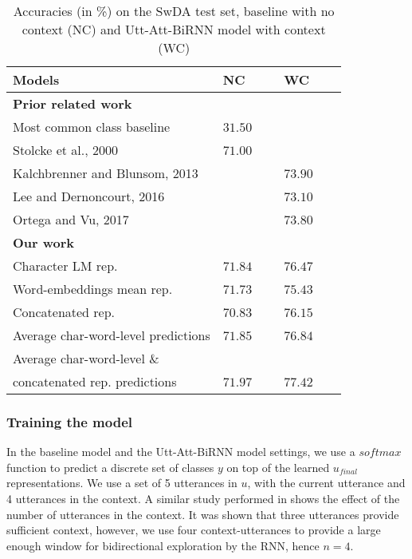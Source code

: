 \documentclass[a4paper]{article}
\begin{document}
\begin{table}[b]
  \caption{Accuracies (in \%) on the SwDA test set, baseline with no context (NC) and Utt-Att-BiRNN model with context (WC)}
  \label{tab:accOnSwDA}
  \centering
  \begin{tabular}{ lll }
    \toprule
    \textbf{Models}       & \textbf{NC}  & \textbf{WC}  \\
\midrule
\textbf{Prior related work}    &    &  \\
    Most common class baseline        & $31.50$~~~    &  \\
    Stolcke et al., 2000 \cite{stolcke2000dialogue} & $71.00$~~~ &    \\
    Kalchbrenner and Blunsom, 2013 \cite{kalchbrenner2013recurrent} & & $73.90$~~~ \\
    Lee and Dernoncourt, 2016 \cite{lee2016sequential} & & $73.10$~~~ \\
    Ortega and Vu, 2017 \cite{ortega2017neural} & & $73.80$~~~ \\
    \textbf{Our work}    &    &  \\
    Character LM rep. &   $71.84$~~~  & $76.47$~~~ \\
    Word-embeddings mean rep.  & $71.73$~~~ & $75.43$~~~ \\
    Concatenated rep.  & $70.83$~~~  &  $76.15$~~~  \\
    Average char-word-level predictions  & $71.85$~~~ & $76.84$~~~ \\
 
    Average char-word-level \&        &    &    \\
    concatenated rep. predictions & $71.97$~~~ & \textbf{$77.42$~~~} \\
    \bottomrule
  \end{tabular}
\end{table}


\subsubsection{Training the model} 

In the baseline model and the Utt-Att-BiRNN model settings, we use a $softmax$ function to predict a discrete set of classes $y$ on top of the learned $u_{final}$ representations. 
We use a set of 5 utterances in $u$, with the current utterance and 4 utterances in the context. 
A similar study performed in \cite{BOTHE18_525} shows the effect of the number of utterances in the context. It was shown that three utterances provide sufficient context, however, we use four context-utterances to provide a large enough window for bidirectional exploration by the RNN, hence $n=4$.
\end{document}
